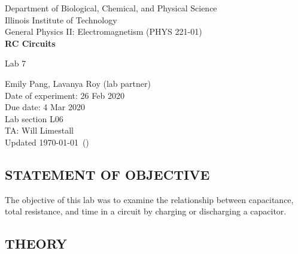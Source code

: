 \documentclass [12pt, letterpaper, twoside] {article}
\begin{document}
\begin {titlepage}
\begin {center}
Department of Biological, Chemical, and Physical Science\\
\vspace {0.1cm}
Illinois Institute of Technology\\
\vspace {0.1cm}
General Physics II: Electromagnetism (PHYS 221-01)\\
\vspace* {\fill}
\begingroup
\Large
\textbf {RC Circuits}
\vspace {0.35cm}

\normalsize
Lab 7 
\vspace {1.5cm}
\endgroup
\vspace* {\fill}
\end {center}

\vspace*{\fill}
\begin {flushright}
\footnotesize
Emily Pang, Lavanya Roy (lab partner) \\
Date of experiment: 26 Feb 2020 \\
Due date: 4 Mar 2020 \\
Lab section L06 \\
TA: Will Limestall \\
Updated \usdate\today~(\currenttime)
\end {flushright}
\end {titlepage}
\subsection* {STATEMENT OF OBJECTIVE}
The objective of this lab was to examine the relationship between capacitance, total resistance, and time in a circuit by charging or discharging a capacitor.

\subsection* {THEORY}
\begin{comment}
The voltage across a capacitor depends on the max voltage it could be charged to, as well as the time it has been charging and a time constant involving the capacitance and the total resistance in the circuit. For charging a capacitor, the voltage can be expressed as:
\begin{equation}
  \begin{split}
    V_{c}(t) &= V_{\text{max}}\left(1-e^{-\sfrac{t}{\tau}}\right) \\
  \end{split}
\end{equation}
where \(V_{\text{max}}\) is the max voltage the capacitor can charge to (non-inclusive), \(t\) is the time the capacitor has been charging, and \(\tau\) is the product of the total resistance in the circuit and the capacitance of the capacitor.
\end{comment}
\end{document}
